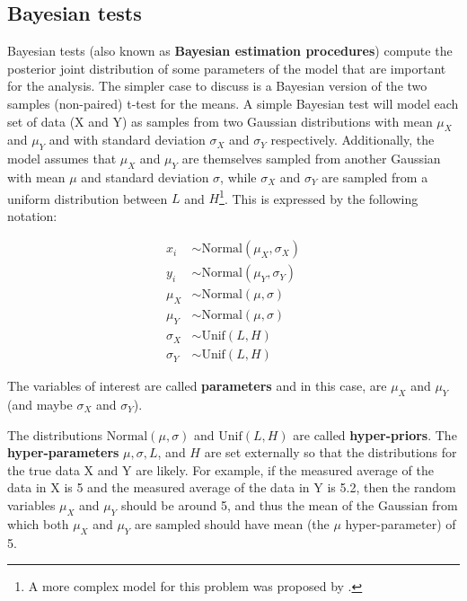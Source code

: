 \documentclass[twoside,11pt,preprint]{article}
\begin{document}
\hypertarget{bayesian-tests}{%
\subsection{\texorpdfstring{Bayesian tests \label{sec:bayestests}}{Bayesian tests }}\label{bayesian-tests}}

Bayesian tests (also known as \textbf{Bayesian estimation procedures})
compute the posterior joint distribution of some parameters of the model
that are important for the analysis. The simpler case to discuss is a
Bayesian version of the two samples (non-paired) t-test for the means.
A simple Bayesian test will model each set of data (X and Y) as
samples from two Gaussian distributions with mean \(\mu_X\) and \(\mu_Y\)
and with standard deviation \(\sigma_X\) and \(\sigma_Y\) respectively.
Additionally, the model assumes that \(\mu_X\) and \(\mu_Y\) are themselves sampled
from another Gaussian with mean \(\mu\) and standard deviation \(\sigma\),
while \(\sigma_X\) and \(\sigma_Y\) are sampled from a uniform
distribution between \(L\) and \(H\)\footnote{A more complex model for this
  problem was proposed by \citet{kruschke2013bayesian}.}. This is expressed by
the following notation:

\begin{align}
x_i & \sim \mbox{Normal}(\mu_X, \sigma_X) \nonumber\\
y_i & \sim \mbox{Normal} (\mu_Y, \sigma_Y)\nonumber\\
\mu_X & \sim \mbox{Normal} (\mu,\sigma) \nonumber\\
\mu_Y & \sim \mbox{Normal} (\mu,\sigma) \label{eq:mod2}\\
\sigma_X & \sim \mbox{Unif}(L,H)\nonumber\\
\sigma_Y & \sim \mbox{Unif}(L,H) \nonumber 
\end{align}

The variables of interest are called \textbf{parameters} and in this case,
are \(\mu_X\) and \(\mu_Y\) (and maybe \(\sigma_X\) and \(\sigma_Y\)).

The distributions \(\mbox{Normal} (\mu,\sigma)\) and \(\mbox{Unif}(L,H)\)
are called \textbf{hyper-priors}. The \textbf{hyper-parameters} \(\mu, \sigma, L\), and \(H\) are set externally so that the distributions for
the true data X and Y are likely. For example, if the measured
average of the data in X is 5 and the measured average of the data in
Y is 5.2, then the random variables \(\mu_X\) and \(\mu_Y\) should be
around 5, and thus the mean of the Gaussian from which both \(\mu_X\)
and \(\mu_Y\) are sampled should have mean (the \(\mu\) hyper-parameter)
of 5.
\end{document}
